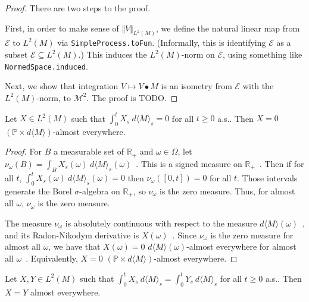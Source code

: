 \begin{proof}
  There are two steps to the proof.

  First, in order to make sense of $\Vert V \Vert_{L^2(M)}$,
  we define the natural linear map from $\mathcal{E}$ to $L^2(M)$ via \texttt{SimpleProcess.toFun}.
  (Informally, this is identifying $\mathcal{E}$ as a subset $\mathcal{E} \subseteq L^2(M)$.)
  This induces the $L^2(M)$-norm on $\mathcal{E}$, using something like \texttt{NormedSpace.induced}.

  Next, we show that integration $V \mapsto V \bullet M$ is an isometry from $\mathcal{E}$
  with the $L^2(M)$-norm, to $\mathcal{M}^2$. The proof is TODO.
\end{proof}


\begin{lemma}\label{lem:integral_process_eq_zero}
Let $X\in L^2(M)$ such that $\int_0^t X_s \: d\langle M \rangle_s = 0$ for all $t \ge 0$ a.s.. Then $X = 0$ $(\mathbb{P} \times d\langle M \rangle)$-almost everywhere.
\end{lemma}

\begin{proof}
For $B$ a measurable set of $\mathbb{R}_+$ and $\omega \in \Omega$, let $\nu_\omega(B) = \int_B X_s(\omega) \: d\langle M \rangle_s(\omega)$~. This is a signed measure on $\mathbb{R}_+$~.
Then if for all $t$, $\int_0^t X_s(\omega) \: d\langle M \rangle_s(\omega) = 0$ then $\nu_\omega([0,t]) = 0$ for all $t$.
Those intervals generate the Borel $\sigma$-algebra on $\mathbb{R}_+$, so $\nu_\omega$ is the zero measure.
Thus, for almost all $\omega$, $\nu_\omega$ is the zero measure.

The measure $\nu_\omega$ is absolutely continuous with respect to the measure $d\langle M \rangle(\omega)$~, and its Radon-Nikodym derivative is $X(\omega)$~.
Since $\nu_\omega$ is the zero measure for almost all $\omega$, we have that $X(\omega) = 0$ $d\langle M \rangle(\omega)$-almost everywhere for almost all $\omega$~.
Equivalently, $X = 0$ $(\mathbb{P} \times d\langle M \rangle)$-almost everywhere.
\end{proof}


\begin{lemma}\label{lem:integral_process_injective}
Let $X, Y \in L^2(M)$ such that $\int_0^t X_s \: d\langle M \rangle_s = \int_0^t Y_s \: d\langle M \rangle_s$ for all $t \ge 0$ a.s.. Then $X = Y$ almost everywhere.
\end{lemma}

